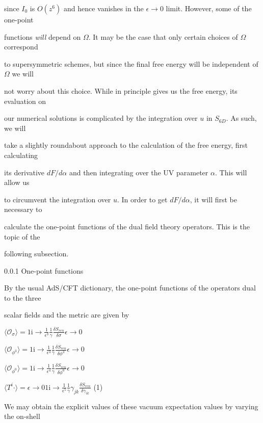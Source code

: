 \documentclass[a4paper,12pt]{article}
\begin{document}
since $I_{0}$ is $O(z^{6})$ and hence vanishes in the $\epsilon\rightarrow 0$ limit. However, some of the one-point

functions {\it will} depend on $\Omega$. It may be the case that only certain choices of $\Omega$ correspond

to supersymmetric schemes, but since the final free energy will be independent of $\Omega$ we will

not worry about this choice. While in principle gives us the free energy, its evaluation on

our numerical solutions is complicated by the integration over $u$ in $S_{6D}$. As such, we will

take a slightly roundabout approach to the calculation of the free energy, first calculating

its derivative $ dF/d\alpha$ and then integrating over the UV parameter $\alpha$. This will allow us

to circumvent the integration over $u$. In order to get $ dF/d\alpha$, it will first be necessary to

calculate the one-point functions of the dual field theory operators. This is the topic of the

following subsection.

0.0.1 One-point functions

By the usual AdS/CFT dictionary, the one-point functions of the operators dual to the three

scalar fields and the metric are given by

$\displaystyle \langle \mathcal{O}_{\sigma}\rangle=1\mathrm{i}\rightarrow\frac{1}{\epsilon^{3}}\frac{1}{\gamma}\frac{\delta S_{ren}}{\delta\sigma}\epsilon\rightarrow 0$

$\displaystyle \langle \mathcal{O}_{\phi^{3}}\rangle=1\mathrm{i}\rightarrow\frac{1}{\epsilon^{3}}\frac{1}{\gamma}\frac{\delta S_{ren}}{\delta\phi^{3}}\epsilon\rightarrow 0$

$\displaystyle \langle \mathcal{O}_{\phi^{0}}\rangle=1\mathrm{i}\rightarrow\frac{1}{\epsilon^{4}}\frac{1}{\gamma}\frac{\delta S_{ren}}{\delta\phi^{0}}\epsilon\rightarrow 0$

$\displaystyle \langle T^{i}\cdot\rangle=\epsilon\rightarrow 01\mathrm{i}\rightarrow\frac{1}{\epsilon^{5}}\frac{1}{\gamma}\gamma_{jk}\frac{\delta S_{ren}}{\delta\gamma_{ik}}$ (1)

We may obtain the explicit values of these vacuum expectation values by varying the on-shell
\end{document}
